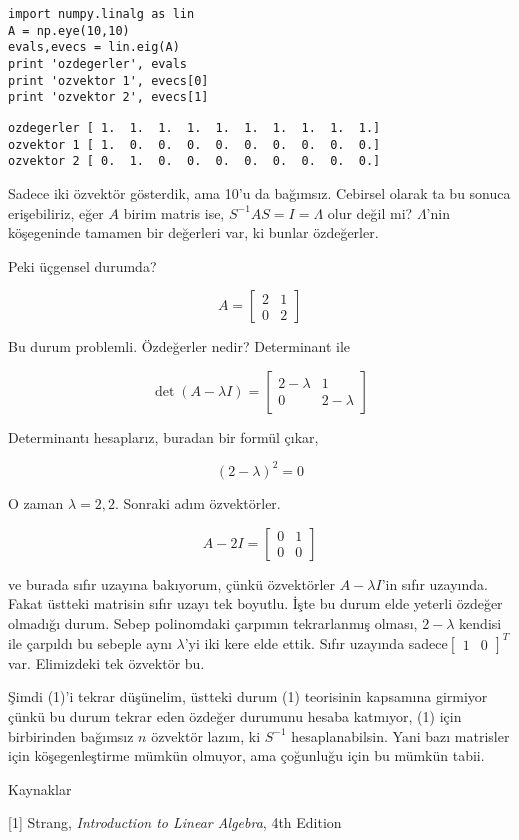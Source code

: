 \documentclass[12pt,fleqn]{article}\usepackage{../../common}
\begin{document}
\begin{verbatim}
import numpy.linalg as lin
A = np.eye(10,10)
evals,evecs = lin.eig(A)
print 'ozdegerler', evals
print 'ozvektor 1', evecs[0]
print 'ozvektor 2', evecs[1]
\end{verbatim}

\begin{verbatim}
ozdegerler [ 1.  1.  1.  1.  1.  1.  1.  1.  1.  1.]
ozvektor 1 [ 1.  0.  0.  0.  0.  0.  0.  0.  0.  0.]
ozvektor 2 [ 0.  1.  0.  0.  0.  0.  0.  0.  0.  0.]
\end{verbatim}

Sadece iki özvektör gösterdik, ama 10'u da bağımsız. Cebirsel olarak ta bu
sonuca erişebiliriz, eğer $A$ birim matris ise, $S^{-1}AS = I = \Lambda$
olur değil mi? $\Lambda$'nin köşegeninde tamamen bir değerleri var, ki
bunlar özdeğerler. 

Peki üçgensel durumda? 

$$ A = \left[\begin{array}{rr}
2 &  1 \\ 0 & 2
\end{array}\right] $$

Bu durum problemli. Özdeğerler nedir? Determinant ile

$$ \det (A-\lambda I) = 
 \left[\begin{array}{rr}
2-\lambda &  1 \\ 0 & 2-\lambda
\end{array}\right]
$$

Determinantı hesaplarız, buradan bir formül çıkar, 

$$ (2-\lambda)^2 = 0 $$

O zaman $\lambda=2,2$. Sonraki adım özvektörler.

$$ A-2I = 
\left[\begin{array}{rr}
0 &  1 \\ 0 & 0
\end{array}\right]
$$

ve burada sıfır uzayına bakıyorum, çünkü özvektörler $A-\lambda I$'in sıfır
uzayında. Fakat üstteki matrisin sıfır uzayı tek boyutlu. İşte bu durum
elde yeterli özdeğer olmadığı durum. Sebep polinomdaki çarpımın
tekrarlanmış olması, $2-\lambda$ kendisi ile çarpıldı bu sebeple aynı
$\lambda$'yi iki kere elde ettik. Sıfır uzayında sadece$\left[\begin{array}{cc} 1 & 0 \end{array}\right]^T$ var. Elimizdeki 
tek özvektör bu. 

Şimdi (1)'i tekrar düşünelim, üstteki durum (1) teorisinin kapsamına
girmiyor çünkü bu durum tekrar eden özdeğer durumunu hesaba katmıyor, (1)
için birbirinden bağımsız $n$ özvektör lazım, ki $S^{-1}$
hesaplanabilsin. Yani bazı matrisler için köşegenleştirme mümkün olmuyor,
ama çoğunluğu için bu mümkün tabii.


Kaynaklar 

[1] Strang, {\em Introduction to Linear Algebra}, 4th Edition
\end{document}

